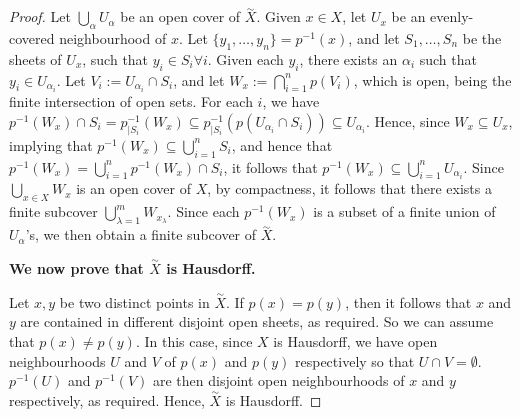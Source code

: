 \documentclass{article}
\begin{document}
\begin{proof}
\noindent Let $\bigcup_\alpha U_\alpha$ be an open cover of $\overset{\sim}{X}$. Given $x\in X$, let $U_x$ be an evenly-covered neighbourhood of $x$. Let $\{y_1,\dots, y_{n}\} = p^{-1}(x)$, and let $S_1,\dots, S_{n}$ be the sheets of $U_x$, such that $y_i\in S_i\forall i$. Given each $y_i$, there exists an $\alpha_i$ such that $y_i\in U_{\alpha_i}$. Let $V_i:=U_{\alpha_i}\cap S_i$, and let $W_x:=\bigcap_{i=1}^np(V_i)$, which is open, being the finite intersection of open sets. For each $i$, we have $p^{-1}(W_x)\cap S_i=p_{|S_i}^{-1}(W_x)\subseteq p_{|S_i}^{-1}(p(U_{\alpha_i}\cap S_i))\subseteq U_{\alpha_i}$. Hence, since $W_x\subseteq U_x$, implying that $p^{-1}(W_x)\subseteq \bigcup_{i=1}^n S_i$, and hence that $p^{-1}(W_x)=\bigcup_{i=1}^n p^{-1}(W_x)\cap S_i$, it follows that $p^{-1}(W_x)\subseteq \bigcup_{i=1}^n U_{\alpha_i}$. Since $\bigcup_{x\in X}W_x$ is an open cover of $X$, by compactness, it follows that there exists a finite subcover $\bigcup_{\lambda=1}^m W_{x_\lambda}$. Since each $p^{-1}(W_x)$ is a subset of a finite union of $U_\alpha$'s, we then obtain a finite subcover of $\overset{\sim}{X}$.

\noindent\textbf{We now prove that $\overset{\sim}{X}$ is Hausdorff.}

\noindent Let $x,y$ be two distinct points in $\overset{\sim}{X}$. If $p(x)=p(y)$, then it follows that $x$ and $y$ are contained in different disjoint open sheets, as required. So we can assume that $p(x)\neq p(y)$. In this case, since $X$ is Hausdorff, we have open neighbourhoods $U$ and $V$ of $p(x)$ and $p(y)$ respectively so that $U\cap V=\emptyset$. $p^{-1}(U)$ and $p^{-1}(V)$ are then disjoint open neighbourhoods of $x$ and $y$ respectively, as required. Hence, $\overset{\sim}{X}$ is Hausdorff.
\end{proof}
\end{document}
